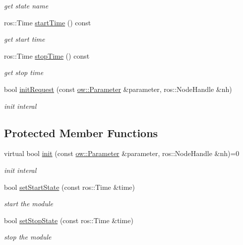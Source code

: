 \begin{DoxyCompactItemize}
\begin{DoxyCompactList}\small\item\em get state name \end{DoxyCompactList}\item 
ros\+::\+Time \hyperlink{classow_1_1GenericModuleBase_a5378be2f445ea95b0569926461775920}{start\+Time} () const \hypertarget{classow_1_1GenericModuleBase_a5378be2f445ea95b0569926461775920}{}\label{classow_1_1GenericModuleBase_a5378be2f445ea95b0569926461775920}

\begin{DoxyCompactList}\small\item\em get start time \end{DoxyCompactList}\item 
ros\+::\+Time \hyperlink{classow_1_1GenericModuleBase_a613e760af794382f43c0607a1891269f}{stop\+Time} () const \hypertarget{classow_1_1GenericModuleBase_a613e760af794382f43c0607a1891269f}{}\label{classow_1_1GenericModuleBase_a613e760af794382f43c0607a1891269f}

\begin{DoxyCompactList}\small\item\em get stop time \end{DoxyCompactList}\item 
bool \hyperlink{classow_1_1GenericModuleBase_ad3c3af233e4c726769bb3bdca14c3e10}{init\+Request} (const \hyperlink{classow_1_1Parameter}{ow\+::\+Parameter} \&parameter, ros\+::\+Node\+Handle \&nh)
\begin{DoxyCompactList}\small\item\em init interal \end{DoxyCompactList}\end{DoxyCompactItemize}
\subsection*{Protected Member Functions}
\begin{DoxyCompactItemize}
\item 
virtual bool \hyperlink{classow_1_1GenericModuleBase_a95c6c7b7a84acd2b4f37b7f9301abf9d}{init} (const \hyperlink{classow_1_1Parameter}{ow\+::\+Parameter} \&parameter, ros\+::\+Node\+Handle \&nh)=0
\begin{DoxyCompactList}\small\item\em init interal \end{DoxyCompactList}\item 
bool \hyperlink{classow_1_1GenericModuleBase_a30cd7aaffeaa38203ddb9c3366454458}{set\+Start\+State} (const ros\+::\+Time \&time)
\begin{DoxyCompactList}\small\item\em start the module \end{DoxyCompactList}\item 
bool \hyperlink{classow_1_1GenericModuleBase_a7a9a90a87f242094334e264429ab08ec}{set\+Stop\+State} (const ros\+::\+Time \&time)
\begin{DoxyCompactList}\small\item\em stop the module \end{DoxyCompactList}\end{DoxyCompactItemize}
